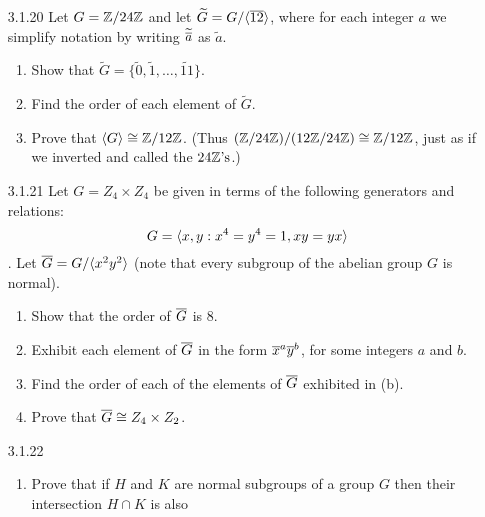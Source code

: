 \begin{enumerate}
\begin{enumerate}
                  \end{enumerate}
   \item[3.1.20]  Let $G = \mathbb{Z}/24\mathbb{Z}$ and let
                  $\widetilde{G} = G/\langle \overline{12} \rangle$, where for each integer $a$
                  we simplify notation by writing $\widetilde{\overline{a}}$ as
                  $\widetilde{a}$.
                  \begin{enumerate}
                     \item Show that $\widetilde{G} = \{\widetilde{0},
                           \widetilde{1}, \ldots, \widetilde{11}\}$.
                     \item Find the order of each element of $\widetilde{G}$.
                     \item Prove that $\langle G \rangle \cong \mathbb{Z}/12\mathbb{Z}$. (Thus
                           $(\mathbb{Z}/24\mathbb{Z})/(12\mathbb{Z}/24\mathbb{Z}) \cong \mathbb{Z}/12\mathbb{Z}$, just as if we
                           inverted and called the $24\mathbb{Z}\text{'s}$.)
                  \end{enumerate}
   \item[3.1.21]  Let $G = Z_4 \times Z_4$ be given in terms of the following
                  generators and relations:
                  $$G = \langle x, y : x^4 = y^4 = 1, xy = yx \rangle$$.
                  Let $\overline{G} = G/\langle x^2y^2 \rangle$ (note that every subgroup of the
                  abelian group $G$ is normal).
                  \begin{enumerate}
                     \item Show that the order of $\overline{G}$ is 8.
                     \item Exhibit each element of $\overline{G}$ in the form
                           $\overline{x}^a\overline{y}^b$, for some integers $a$ and $b$.
                     \item Find the order of each of the elements of $\overline{G}$
                           exhibited in (b).
                     \item Prove that $\overline{G} \cong Z_4 \times Z_2$.
                  \end{enumerate}
   \item[3.1.22]  \begin{enumerate}
                     \item Prove that if $H$ and $K$ are normal subgroups of a
                           group $G$ then their intersection $H \cap K$ is also

\end{enumerate}
\end{enumerate}
